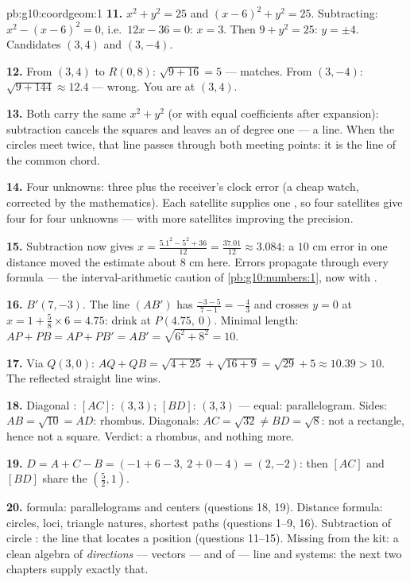 \begin{solution}{pb:g10:coordgeom:1}
\textbf{11.} $x^2 + y^2 = 25$ and $(x - 6)^2 + y^2 = 25$.
Subtracting: $x^2 - (x - 6)^2 = 0$, i.e.\ $12x - 36 = 0$:
$x = 3$. Then $9 + y^2 = 25$: $y = \pm 4$. Candidates
$(3, 4)$ and $(3, -4)$.

\textbf{12.} From $(3, 4)$ to $R(0, 8)$:
$\sqrt{9 + 16} = 5$ --- matches. From $(3, -4)$:
$\sqrt{9 + 144} \approx 12.4$ --- wrong. You are at $(3, 4)$.

\textbf{13.} Both  carry the same $x^2 + y^2$ (or with
equal coefficients after expansion): subtraction cancels the
squares and leaves an  of degree one --- a line. When
the circles meet twice, that line passes through both meeting
points: it is the line of the common chord.

\textbf{14.} Four unknowns: three  plus the
receiver's clock error (a cheap watch, corrected by the
mathematics). Each satellite supplies one , so four
satellites give four  for four unknowns --- with more
satellites improving the precision.

\textbf{15.} Subtraction now gives
$x = \frac{5.1^2 - 5^2 + 36}{12} = \frac{37.01}{12} \approx
3.084$: a $10$ cm error in one distance moved the estimate
about $8$ cm here. Errors propagate through every formula ---
the interval-arithmetic caution of \cref{pb:g10:numbers:1},
now with .

\textbf{16.} $B' (7, -3)$. The line $(AB')$ has 
$\frac{-3 - 5}{7 - 1} = -\frac43$ and crosses $y = 0$ at
$x = 1 + \frac{5}{8} \times 6 = 4.75$: drink at
$P(4.75,\ 0)$. Minimal length: $AP + PB = AP + PB' = AB' =
\sqrt{6^2 + 8^2} = 10$.

\textbf{17.} Via $Q(3, 0)$:
$AQ + QB = \sqrt{4 + 25} + \sqrt{16 + 9} = \sqrt{29} + 5
\approx 10.39 > 10$. The reflected straight line wins.

\textbf{18.} Diagonal : $[AC]$: $(3, 3)$; $[BD]$:
$(3, 3)$ --- equal: parallelogram. Sides:
$AB = \sqrt{10} = AD$: rhombus. Diagonals:
$AC = \sqrt{32} \neq BD = \sqrt{8}$: not a rectangle, hence
not a square. Verdict: a rhombus, and nothing more.

\textbf{19.} $D = A + C - B = (-1 + 6 - 3,\ 2 + 0 - 4) =
(2, -2)$: then $[AC]$ and $[BD]$ share the 
$\left(\frac52, 1\right)$.

\textbf{20.}  formula: parallelograms and centers
(questions 18, 19). Distance formula: circles, loci, triangle
natures, shortest paths (questions 1--9, 16). Subtraction of
circle : the line that locates a position (questions
11--15). Missing from the kit: a clean algebra of
\emph{directions} --- vectors --- and of \emph{} ---
line  and systems: the next two chapters supply
exactly that.
\end{solution}

